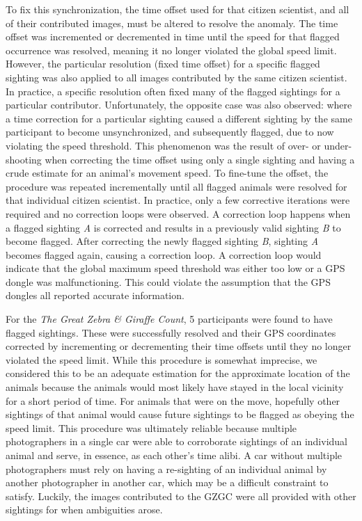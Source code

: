 To fix this synchronization, the time offset used for that citizen scientist, and all of their contributed images, must be altered to resolve the anomaly.  The time offset was incremented or decremented in time until the speed for that flagged occurrence was resolved, meaning it no longer violated the global speed limit.  However, the particular resolution (fixed time offset) for a specific flagged sighting was also applied to all images contributed by the same citizen scientist.  In practice, a specific resolution often fixed many of the flagged sightings for a particular contributor.  Unfortunately, the opposite case was also observed: where a time correction for a particular sighting caused a different sighting by the same participant to become unsynchronized, and subsequently flagged, due to now violating the speed threshold.  This phenomenon was the result of over- or under-shooting when correcting the time offset using only a single sighting and having a crude estimate for an animal's movement speed.  To fine-tune the offset, the procedure was repeated incrementally until all flagged animals were resolved for that individual citizen scientist.   In practice, only a few corrective iterations were required and no correction loops were observed.  A correction loop happens when a flagged sighting \textit{A} is corrected and results in a previously valid sighting \textit{B} to become flagged.  After correcting the newly flagged sighting \textit{B}, sighting \textit{A} becomes flagged again, causing a correction loop.  A correction loop would indicate that the global maximum speed threshold was either too low or a GPS dongle was malfunctioning.  This could violate the assumption that the GPS dongles all reported accurate information.

For the \textit{The Great Zebra \& Giraffe Count}, 5 participants were found to have flagged sightings.  These were successfully resolved and their GPS coordinates corrected by incrementing or decrementing their time offsets until they no longer violated the speed limit.  While this procedure is somewhat imprecise, we considered this to be an adequate estimation for the approximate location of the animals because the animals would most likely have stayed in the local vicinity for a short period of time.  For animals that were on the move, hopefully other sightings of that animal would cause future sightings to be flagged as obeying the speed limit.  This procedure was ultimately reliable because multiple photographers in a single car were able to corroborate sightings of an individual animal and serve, in essence, as each other's time alibi.  A car without multiple photographers must rely on having a re-sighting of an individual animal by another photographer in another car, which may be a difficult constraint to satisfy.  Luckily, the images contributed to the GZGC were all provided with other sightings for when ambiguities arose.

